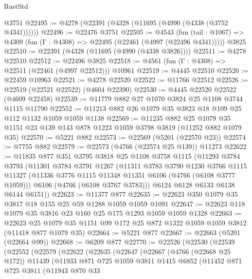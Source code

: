 \begin{lexlean}{RustStd}
\begin{coremodule}
{\begin{coremodule}
{{{{{{{{{{{{{{{{{{{{{{{{{{{{{{{{{{{    @3751
@22495 := @4278 (@22391 (@4328 (@11695 (@4990 (@4338 (@3752 @4341))))))
@22496 := @22476 @3751
@22505 := @4543
    (fun (tail : @1067) => @4309 (fun (Γ : @4308) => @22495 (@22461 (@4997 (@22496 @4341)))))
    @3825
@22510 := @22391 (@4328 (@11695 (@4990 (@4338 @3826))))
@22511 := @4278 @22510
@22512 := @22496 @3825
@22518 := @4561 (fun (Γ : @4308) => @22511 (@22461 (@4997 @22512))) @10961
@22519 := @4445 @22510
@22520 := @22459 @10963
@22521 := @4278 @22520
@22522 := @11766 @22512
@22526 := @22519 (@22521 @22522) (@4604 @22390)
@22530 := @4445 @22520 @22522 (@4609 @22458)
@22539 := @11779 @882 @27 @1070 @3824 @25 @1108 @3744 @1115 @11790
@22552 := @11213 @882 @26 @1079 @35 @3823 @18 @109 @25 @112 @1132 @1059 @1059 @1138
@22569 := @11235
    @882
    @25
    @1079
    @35
    @1151
    @23
    @139
    @143
    @878
    @1223
    @1059
    @3798
    @3819
    (@11252 @882 @1079 @35)
@22570 := @5221 @882
@22573 := @22569 (@5201 (@22570 @23))
@22574 := @7755 @882
@22579 := @22573 (@4766 (@22574 @25 @139)) @11273
@22622 := @11835
    @877
    @351
    @3795
    @3818
    @25
    @1108
    @3758
    @1115
    (@11293
      @3784
      @3793
      (@11301
        @3784
        @3791
        @1267
        (@11311
          @3783
          @3790
          @1230
          @3766
          @1115
          @11327
          (@11336 @3776 @1115 @11348 @11351 @6106 (@4766 (@6108 @3777 @1059)))
          @6106
          (@4766 (@6108 @3767 @3783)))
        @6124
        @6128
        @6133
        @6138
        @6144
        @6151))
@22623 := @11377 @877
@22635 := @22623 @350 @1079 @35 @3817 @18 @155 @25 @59 @1288 @1059 @1059 @1091
@22647 := @22623 @118 @1079 @35 @3816 @23 @160 @25 @175 @1293 @1059 @1059 @1328
@22663 := @22623
    @25
    @1079
    @35
    @1151
    @99
    @172
    @25
    @872
    @1322
    @1059
    @1059
    @3812
    (@11418 @877 @1079 @35)
@22664 := @5221 @877
@22667 := @22663 (@5201 (@22664 @99))
@22668 := @6209 @877
@22770 := @22526
    (@22530
      (@22539
        (@22552
          (@22579
            (@22622
              (@22635
                (@22647
                  (@22667
                    (@4766 (@22668 @25 @172))
                    @11439
                    (@11933
                      @871
                      @725
                      @1059
                      @3811
                      @1415
                      @6852
                      (@11452
                        @871
                        @725
                        @3811
                        (@11943
                          @870
                          @33
}}}}}}}}}}}}}}}}}}}}}}}}}}}}}}}}}}}
\end{coremodule}}
\end{coremodule}
\end{lexlean}
